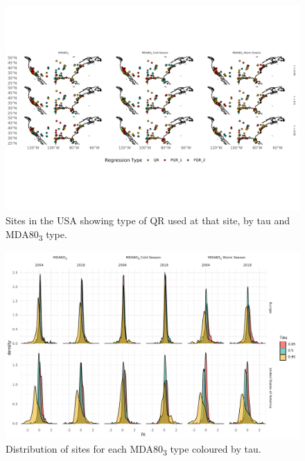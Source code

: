 \documentclass{article}
\begin{document}
\begin{figure}
\centering
\includegraphics[width=\linewidth]{figures/si_figures/fS04_regression_type_map_us.pdf}
\caption{Sites in the USA showing type of QR used at that site, by tau and MDA80\textsubscript{3} type.}
\label{si_fig:reg_map_us}
\end{figure}
\clearpage


\begin{figure}
\centering
\includegraphics[width=\linewidth]{figures/si_figures/fS05_slope_density.pdf}
\caption{Distribution of sites for each MDA80\textsubscript{3} type coloured by tau.}
\label{si_fig:slope_density}
\end{figure}
\clearpage

\end{document}
